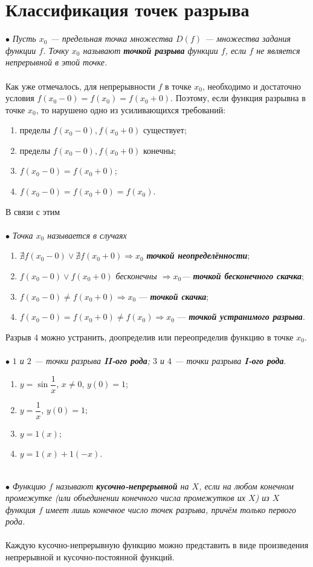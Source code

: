 \section{Классификация точек разрыва}
$\bullet$ \textit{Пусть $x_0$ --- предельная точка множества $D(f)$ --- множества задания функции $f$. Точку $x_0$ называют \textbf{точкой разрыва} функции $f$, если $f$ не является непрерывной в этой точке.} \\\\
Как уже отмечалось, для непрерывности $f$ в точке $x_0$, необходимо и достаточно условия $f(x_0 - 0)=f(x_0)=f(x_0+0)$.
Поэтому, если функция разрывна в точке $x_0$, то нарушено одно из усиливающихся требований:
\begin{enumerate}
	\item пределы $f(x_0-0), f(x_0+0)$ существует;
	\item пределы $f(x_0-0), f(x_0+0)$ конечны;
	\item $f(x_0-0)=f(x_0+0)$;
	\item $f(x_0-0)= f(x_0+0) = f(x_0)$.
\end{enumerate}
В связи с этим\\\\
$\bullet$ \textit{Точка $x_0$ называется в случаях}
\begin{enumerate}
	\item $\nexists f(x_0-0) \vee \nexists f(x_0+0) \Rightarrow x_0$ \textit{\textbf{точкой неопределённости}};
	\item $f(x_0-0) \vee f(x_0+0)$  \textit{бесконечны $\Rightarrow x_0 $--- \textbf{точкой бесконечного скачка}};
	\item $f(x_0-0) \ne f(x_0+0) \Rightarrow x_0$ --- \textit{\textbf{точкой скачка}};
	\item $f(x_0-0) = f(x_0+0) \ne f(x_0) \Rightarrow x_0$ ---\textit{ \textbf{точкой устранимого разрыва}}.
\end{enumerate}
Разрыв $4$ можно устранить, доопределив или переопределив функцию в точке $x_0$.\\\\
$\bullet$\textit{ $1$ и $2$ --- точки разрыва \textbf{II-ого рода}; $3$ и $4$ --- точки разрыва \textbf{I-ого рода}}.\\
\begin{example}\begin{enumerate}
		\item 	$y = \sin{\dfrac{1}{x}}$, $x \ne 0$, $y(0)=1$;
		\item $y = \dfrac{1}{x}$, $y(0) = 1$;
		\item $y = 1(x)$;
		\item $y = 1(x)+1(-x)$.
	\end{enumerate}
\end{example}\\
$\bullet$ \textit{Функцию $f$ называют \textbf{кусочно-непрерывной} на $X$, если на любом конечном промежутке (или объединении конечного числа промежутков их $X$) из $X$
	функция $f$ имеет лишь конечное число точек разрыва, причём только первого рода.}\\\\
Каждую кусочно-непрерывную функцию можно представить в виде произведения непрерывной и кусочно-постоянной функций.

